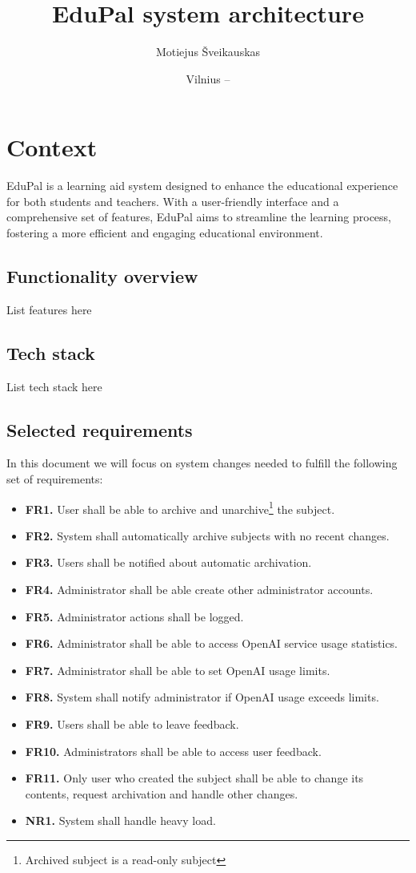 \documentclass[
    english, %
]{VUMIFPSkursinis}
\title{EduPal system architecture}
\author{Motiejus Šveikauskas}
\date{Vilnius – \the\year}
\begin{document}
\maketitle

\tableofcontents

\section{Context}
EduPal is a learning aid system designed to enhance
the educational experience for both students and teachers. With a user-friendly interface and a comprehensive set of features, EduPal aims to streamline the learning process, fostering a more efficient and engaging educational environment.

\subsection{Functionality overview}
List features here

\subsection{Tech stack}
List tech stack here

\subsection{Selected requirements}
In this document we will focus on system changes needed to fulfill the following set of requirements:

\begin{itemize}
    \item \textbf{FR1.} User shall be able to archive and unarchive\footnote{Archived subject is a read-only subject} the subject.
    \item \textbf{FR2.} System shall automatically archive subjects with no recent changes.
    \item \textbf{FR3.} Users shall be notified about automatic archivation.
    \item \textbf{FR4.} Administrator shall be able create other administrator accounts.
    \item \textbf{FR5.} Administrator actions shall be logged.
    \item \textbf{FR6.} Administrator shall be able to access OpenAI service usage statistics.
    \item \textbf{FR7.} Administrator shall be able to set OpenAI usage limits.
    \item \textbf{FR8.} System shall notify administrator if OpenAI usage exceeds limits.
    \item \textbf{FR9.} Users shall be able to leave feedback.
    \item \textbf{FR10.} Administrators shall be able to access user feedback.
    \item \textbf{FR11.} Only user who created the subject shall be able to change its contents, request archivation and handle other changes.
    \item \textbf{NR1.} System shall handle heavy load.
\end{itemize}
\end{document}
